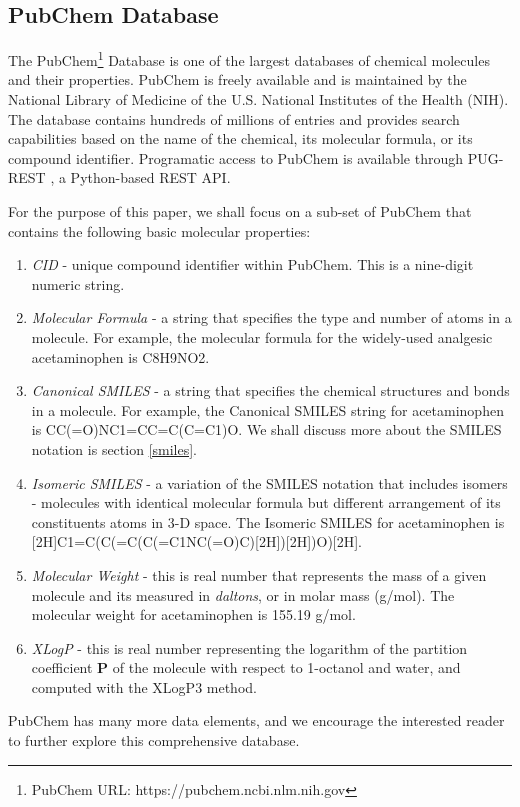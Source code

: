 \subsection{PubChem Database}
The PubChem\footnote{PubChem URL: https://pubchem.ncbi.nlm.nih.gov} Database is one of the largest databases of chemical molecules and their properties. PubChem is freely available and is maintained by the National Library of  Medicine of the U.S. National Institutes of the Health (NIH). The database contains hundreds of millions of entries and provides search capabilities based on the name of the chemical, its molecular formula, or its compound identifier.  Programatic access to  PubChem is available through PUG-REST \cite{pubREST}, a Python-based REST API. 

For the purpose of this paper, we shall focus on a sub-set of PubChem that contains the following basic molecular properties:
\begin{enumerate}
	\item {\em CID} - unique compound identifier within PubChem. This is a nine-digit numeric string. 
	\item {\em Molecular Formula} -  a string that specifies the type and number of atoms in a molecule. For example, the molecular formula for the widely-used analgesic acetaminophen is C8H9NO2.
	\item {\em Canonical SMILES} - a string that specifies the chemical structures and bonds in a molecule. For example, the Canonical SMILES string for acetaminophen is CC(=O)NC1=CC=C(C=C1)O. We shall discuss more about the SMILES notation is section \ref{smiles}.
	\item {\em Isomeric SMILES} - a variation of the SMILES notation that includes isomers - molecules with identical molecular formula but different arrangement of its constituents atoms in 3-D space. The Isomeric SMILES for acetaminophen is [2H]C1=C(C(=C(C(=C1NC(=O)C)[2H])[2H])O)[2H].
	\item {\em Molecular Weight} - this is real number that represents the mass of a given molecule and its measured in {\em daltons}, or in molar mass (g/mol). The molecular weight for acetaminophen is 155.19 g/mol.
	\item {\em XLogP} - this is real number representing the logarithm of the partition coefficient $\boldsymbol P$ of the molecule with respect to 1-octanol and water, and computed with the XLogP3 method. 
\end{enumerate}
PubChem has many more data elements, and we encourage the interested reader to further explore this comprehensive database. 

